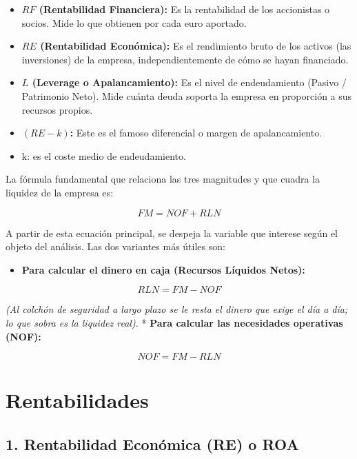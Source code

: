 \documentclass[12pt]{book} %
\providecommand{\tightlist}{%
  \setlength{\itemsep}{0pt}\setlength{\parskip}{0pt}}
\begin{document}
\begin{itemize}
\tightlist
\item
  \textbf{\(RF\) (Rentabilidad Financiera):} Es la rentabilidad de los
  accionistas o socios. Mide lo que obtienen por cada euro aportado.
\item
  \textbf{\(RE\) (Rentabilidad Económica):} Es el rendimiento bruto de
  los activos (las inversiones) de la empresa, independientemente de
  cómo se hayan financiado.
\item
  \textbf{\(L\) (Leverage o Apalancamiento):} Es el nivel de
  endeudamiento (Pasivo / Patrimonio Neto). Mide cuánta deuda soporta la
  empresa en proporción a sus recursos propios.
\item
  \textbf{\((RE - k)\):} Este es el famoso diferencial o margen de
  apalancamiento.
\item
  k: es el coste medio de endeudamiento.
\end{itemize}

La fórmula fundamental que relaciona las tres magnitudes y que cuadra la
liquidez de la empresa es:

\[FM = NOF + RLN\]

A partir de esta ecuación principal, se despeja la variable que interese
según el objeto del análisis. Las dos variantes más útiles son:

\begin{itemize}
\tightlist
\item
  \textbf{Para calcular el dinero en caja (Recursos Líquidos Netos):}
\end{itemize}

\[RLN = FM - NOF\]

\emph{(Al colchón de seguridad a largo plazo se le resta el dinero que
exige el día a día; lo que sobra es la liquidez real).} * \textbf{Para
calcular las necesidades operativas (NOF):}

\[NOF = FM - RLN\]

\hypertarget{rentabilidades}{%
\section{Rentabilidades}\label{rentabilidades}}

\hypertarget{rentabilidad-econuxf3mica-re-o-roa}{%
\subsection{1. Rentabilidad Económica (RE) o
ROA}\label{rentabilidad-econuxf3mica-re-o-roa}}
\end{document}
